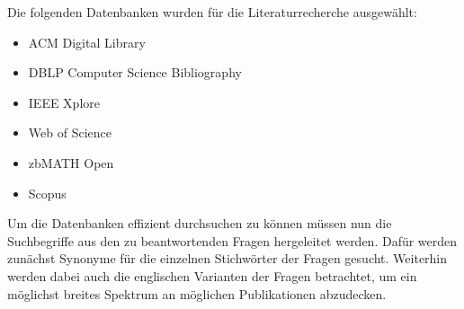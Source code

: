 Die folgenden Datenbanken wurden für die Literaturrecherche ausgewählt:

\begin{itemize}
    \item ACM Digital Library
    \item DBLP Computer Science Bibliography
    \item IEEE Xplore
    \item Web of Science
    \item zbMATH Open
    \item Scopus
\end{itemize}

Um die Datenbanken effizient durchsuchen zu können müssen nun die Suchbegriffe aus den zu beantwortenden Fragen hergeleitet werden. Dafür werden zunächst Synonyme für die einzelnen Stichwörter der Fragen gesucht. Weiterhin werden dabei auch die englischen Varianten der Fragen betrachtet, um ein möglichst breites Spektrum an möglichen Publikationen abzudecken.

